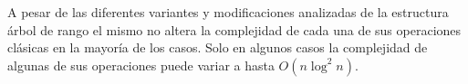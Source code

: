 A pesar de las diferentes variantes y modificaciones analizadas de la estructura árbol de rango el mismo no altera la complejidad de cada una de sus operaciones clásicas en la mayoría de los casos. Solo en algunos casos la complejidad de algunas de sus operaciones puede variar a hasta  $O(n \log^2 n)$.